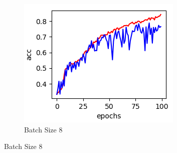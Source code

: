 \documentclass[../main.tex]{subfiles}
\begin{document}
\begin{figure}[h!]
\begin{subfigure}[b]{0.3\linewidth}
    \includegraphics[width=\linewidth]{batch-size-img/bs8.png}
    \caption{Batch Size 8}
  \end{subfigure}
\end{figure}
\end{document}
